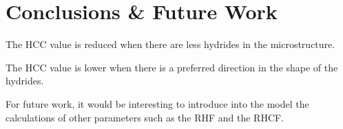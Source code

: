 \newpage
\section{Conclusions \& Future Work}

\noindent
The HCC value is reduced when there are less hydrides in the microstructure.

\noindent
The HCC value is lower when there is a preferred direction in the shape of the hydrides.

\noindent
For future work, it would be interesting to introduce into the model the calculations of other parameters such as the RHF and the RHCF.